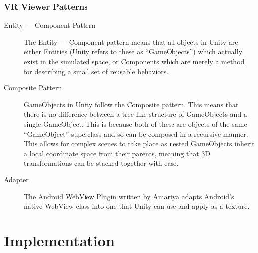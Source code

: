 \documentclass[12pt]{report}
\begin{document}
\subsubsection{VR Viewer Patterns}
\begin{description}
 \item [Entity --- Component Pattern] The Entity --- Component pattern means that all objects in Unity are either Entities (Unity refers to these as ``GameObjects'') which actually exist in the simulated space, or Components which are merely a method for describing a small set of reusable behaviors.

 \item [Composite Pattern] GameObjects in Unity follow the Composite pattern. This means that there is no difference between a tree-like structure of GameObjects and a single GameObject. This is because both of these are objects of the same ``GameObject'' superclass and so can be composed in a recursive manner. This allows for complex scenes to take place as nested GameObjects inherit a local coordinate space from their parents, meaning that 3D transformations can be stacked together with ease.

\item [Adapter] The Android WebView Plugin written by Amartya adapts Android's native WebView class into one that Unity can use and apply as a texture.

\end{description}

\section{Implementation}
\end{document}

